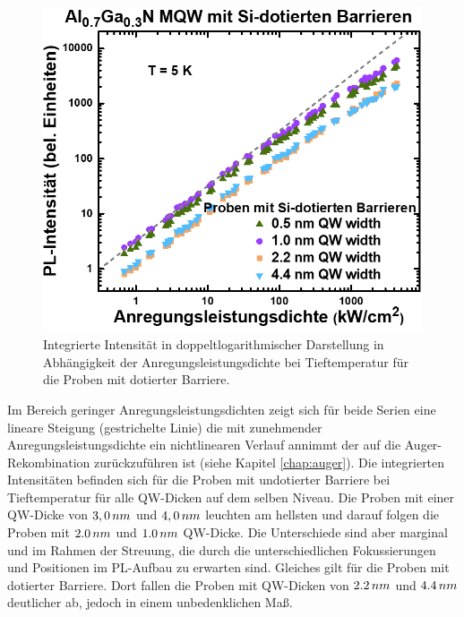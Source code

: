 \begin{figure}[H]
\begin{minipage}[t]{0.49\textwidth}
    \includegraphics[width=\linewidth]{Bilder/MQWdickenSerie/intTTdotierte.png}
		\caption{Integrierte Intensität in doppeltlogarithmischer Darstellung in Abhängigkeit der Anregungsleistungsdichte bei Tieftemperatur für die Proben mit dotierter Barriere.}
    \label{fig:dotiertint}
  \end{minipage}
\end{figure}
\noindent 
%
Im Bereich geringer Anregungsleistungsdichten zeigt sich für beide Serien eine lineare Steigung (gestrichelte Linie) die mit zunehmender Anregungsleistungsdichte ein nichtlinearen Verlauf annimmt der auf die Auger-Rekombination zurückzuführen ist (siehe Kapitel \ref{chap:auger}).
Die integrierten Intensitäten befinden sich für die Proben mit undotierter Barriere bei Tieftemperatur für alle QW-Dicken auf dem selben Niveau.
\newline
Die Proben mit einer QW-Dicke von $3,0 \thinspace nm$ und $4,0 \thinspace nm$ leuchten am hellsten und darauf folgen die Proben mit $2.0 \thinspace nm$ und $1.0 \thinspace nm$  QW-Dicke. Die Unterschiede sind aber marginal und im Rahmen der Streuung, die durch die unterschiedlichen Fokussierungen und Positionen im PL-Aufbau zu erwarten sind. Gleiches gilt für die Proben mit dotierter Barriere. Dort fallen die Proben mit QW-Dicken von $2.2 \thinspace nm$ und $4.4 \thinspace nm$ deutlicher ab, jedoch in einem unbedenklichen Maß.   
